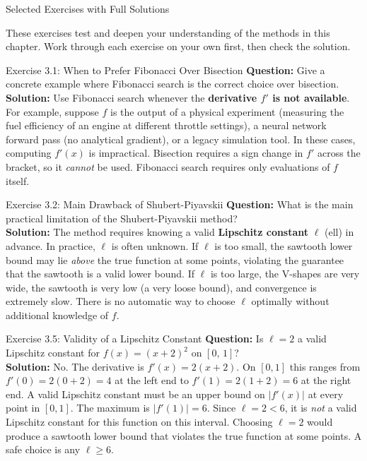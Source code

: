 \documentclass[aspectratio=169,10pt]{beamer}
\begin{document}
\begin{frame}[allowframebreaks]{Selected Exercises with Full Solutions}

  These exercises test and deepen your understanding of the methods in this
  chapter.  Work through each exercise on your own first, then check the
  solution.

  \begin{block}{Exercise 3.1: When to Prefer Fibonacci Over Bisection}
    \textbf{Question:} Give a concrete example where Fibonacci search is
    the correct choice over bisection.\\[6pt]
    \textbf{Solution:} Use Fibonacci search whenever the \textbf{derivative
    $f'$ is not available}.  For example, suppose $f$ is the output of a
    physical experiment (measuring the fuel efficiency of an engine at different
    throttle settings), a neural network forward pass (no analytical gradient),
    or a legacy simulation tool.  In these cases, computing $f'(x)$ is
    impractical.  Bisection requires a sign change in $f'$ across the bracket,
    so it \emph{cannot} be used.  Fibonacci search requires only evaluations
    of $f$ itself.
  \end{block}

  \begin{block}{Exercise 3.2: Main Drawback of Shubert-Piyavskii}
    \textbf{Question:} What is the main practical limitation of the
    Shubert-Piyavskii method?\\[6pt]
    \textbf{Solution:} The method requires knowing a valid \textbf{Lipschitz
    constant} $\ell$ (ell) in advance.  In practice, $\ell$ is often
    unknown.  If $\ell$ is too small, the sawtooth lower bound may lie
    \emph{above} the true function at some points, violating the guarantee
    that the sawtooth is a valid lower bound.  If $\ell$ is too large, the
    V-shapes are very wide, the sawtooth is very low (a very loose bound),
    and convergence is extremely slow.  There is no automatic way to choose
    $\ell$ optimally without additional knowledge of $f$.
  \end{block}

  \begin{block}{Exercise 3.5: Validity of a Lipschitz Constant}
    \textbf{Question:} Is $\ell = 2$ a valid Lipschitz constant for
    $f(x) = (x + 2)^2$ on $[0,\, 1]$?\\[6pt]
    \textbf{Solution:} No.  The derivative is $f'(x) = 2(x + 2)$.  On $[0, 1]$
    this ranges from $f'(0) = 2(0 + 2) = 4$ at the left end to
    $f'(1) = 2(1 + 2) = 6$ at the right end.  A valid Lipschitz constant
    must be an upper bound on $|f'(x)|$ at every point in $[0, 1]$.  The
    maximum is $|f'(1)| = 6$.  Since $\ell = 2 < 6$, it is \emph{not}
    a valid Lipschitz constant for this function on this interval.  Choosing
    $\ell = 2$ would produce a sawtooth lower bound that violates the
    true function at some points.  A safe choice is any $\ell \ge 6$.
  \end{block}


\end{frame}
\end{document}
